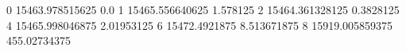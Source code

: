 0 15463.978515625 0.0
1 15465.556640625 1.578125
2 15464.361328125 0.3828125
4 15465.998046875 2.01953125
6 15472.4921875 8.513671875
8 15919.005859375 455.02734375
